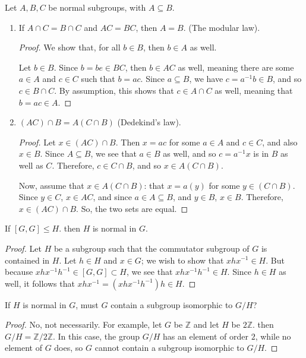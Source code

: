 \documentclass[12pt]{article}
\newcommand{\Z}{\mathbb{Z}}
\theoremstyle{definition}
\newenvironment{problem}[2][Problem]{\begin{trivlist}
\item[\hskip \labelsep {\bfseries #1}\hskip \labelsep {\bfseries #2.}]}{\end{trivlist}}
\begin{document}
\begin{problem}{8}
Let $A,B,C$ be normal subgroups, with $A \subseteq B$.
\begin{enumerate}[label=(\alph*)]
    \item If $A \cap C = B \cap C$ and $AC = BC$, then $A = B$. (The modular law).
    \begin{proof}
    We show that, for all $b \in B$, then $b \in A$ as well. 
    \par Let $b \in B$. Since $b = be \in BC$, then $b \in AC$ as well, meaning there are some $a \in A$ and $c \in C$ such that $b = ac$. Since $a \subseteq B$, we have $c = a^{-1}b \in B$, and so $c \in B \cap C$. By assumption, this shows that $c \in A \cap C$ as well, meaning that $b = ac \in A$.
    \end{proof}
    \item $(AC) \cap B = A(C \cap B)$ (Dedekind's law).
    \begin{proof}
	    Let $x \in (AC) \cap B$. Then $x = ac$ for some $a \in A$ and $c \in C$, and also $x \in B$. Since $A \subseteq B$, we see that $a \in B$ as well, and so $c = a^{-1}x$ is in $B$ as well as $C$. Therefore, $c \in C \cap B$, and so $x \in A(C \cap B)$.
	    \par Now, assume that $x \in A(C \cap B)$: that $x = a(y)$ for some $y \in (C \cap B)$. Since $y \in C$, $x \in AC$, and since $a \in A \subseteq B$, and $y \in B$, $x \in B$. Therefore, $x \in (AC) \cap B$. So, the two sets are equal.
    \end{proof}
\end{enumerate}
\end{problem}
\begin{problem}{9}
If $[G,G] \leq H$. then $H$ is normal in $G$.
\begin{proof}
	Let $H$ be a subgroup such that the commutator subgroup of $G$ is contained in $H$.  Let $h \in H$ and $x \in G$; we wish to show that $xhx^{-1} \in H$. But because $xhx^{-1}h^{-1} \in [G,G] \subset H$, we see that $xhx^{-1}h^{-1} \in H$. Since $h \in H$ as well, it follows that $xhx^{-1} = (xhx^{-1}h^{-1})h \in H$.
\end{proof}
\end{problem}
\begin{problem}{10}
If $H$ is normal in $G$, must $G$ contain a subgroup isomorphic to $G / H$?
\begin{proof}
    No, not necessarily. For example, let $G$ be $\Z$ and let $H$ be $2\Z$. then $G / H = \Z / 2\Z$. In this case, the group $G/ H$ has an element of order $2$, while no element of $G$ does, so $G$ cannot contain a subgroup isomorphic to $G/H$.
\end{proof}
\end{problem}
\end{document}
